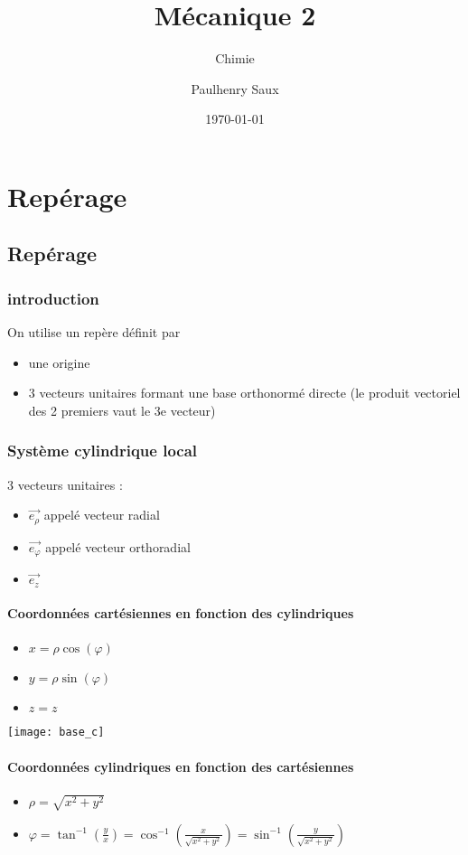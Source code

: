 \documentclass[french]{yLectureNote}
\title{Mécanique 2}
\subtitle{Chimie}
\author{Paulhenry Saux}
\date{\today}
\renewcommand{\vec}{\overrightarrow}
\begin{document}
\chapter{Repérage}
\section{Repérage}
\subsection{introduction}
On utilise un repère définit par
\begin{itemize}
    \item une origine
    \item 3 vecteurs unitaires formant une base orthonormé directe (le produit vectoriel des 2 premiers vaut le 3e vecteur)
\end{itemize}
\subsection{Système cylindrique local}
\begin{multicols}{2}
3 vecteurs unitaires :
\begin{itemize}
 \item $\vec{e_{\rho}}$ appelé vecteur radial
  \item $\vec{e_{\varphi}}$ appelé vecteur orthoradial
  \item $\vec{e_z}$
\end{itemize}

\subsubsection{Coordonnées cartésiennes en fonction des cylindriques}
\begin{itemize}
 \item $x = \rho \cos(\varphi)$
 \item $ y = \rho \sin(\varphi)$
 \item $z = z$
\end{itemize}
\columnbreak

\texttt{[image: base\_c]}

\end{multicols}
\subsubsection{Coordonnées cylindriques en fonction des cartésiennes}
\begin{itemize}
 \item $\rho = \sqrt{x^2+y^2}$
 \item $\varphi = \tan^{-1}(\frac{y}{x}) = \cos^{-1}(\frac{x}{\sqrt{x^2+y^2}}) = \sin^{-1}(\frac{y}{\sqrt{x^2+y^2}})$
\end{itemize}
\end{document}
